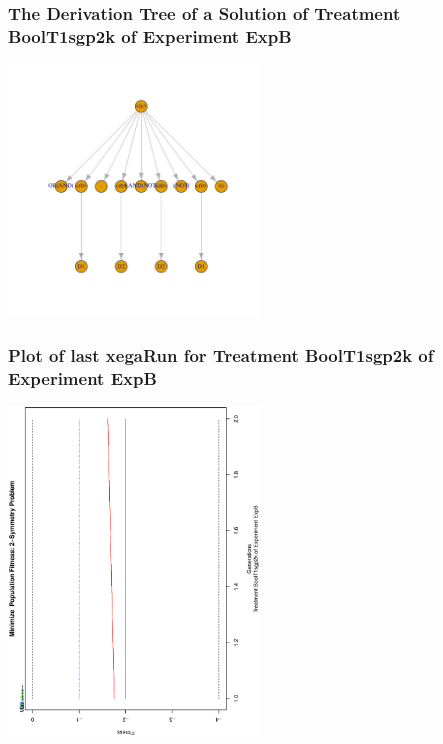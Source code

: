 \documentclass[18pt,c]{beamer}
\begin{document}
 \begin{frame}
 \frametitle{ The Derivation Tree of a Solution of Treatment BoolT1sgp2k of Experiment ExpB }
 \begin{center}
\includegraphics[width=0.5\textwidth, angle=0]
{ExpBDerivationTreeFigure005.pdf}
 \end{center}
 \label{report/ExpBDerivationTreeFigure005.pdf}  
 \end{frame}

 \begin{frame}
 \frametitle{ Plot of last xegaRun for Treatment BoolT1sgp2k of Experiment ExpB }
 \begin{center}
\includegraphics[width=0.5\textwidth, angle=-90]
{ExpBPlotPopStatsFigure005.eps}
 \end{center}
 \label{report/ExpBPlotPopStatsFigure005.eps}  
 \end{frame}
\end{document}
